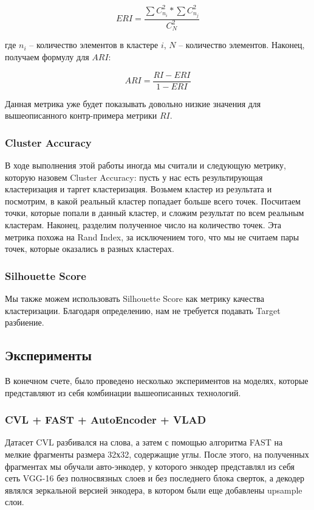 $$
ERI = \frac{\sum C_{n_i}^2 * \sum C_{n_j}^2}{C_N^2}
$$

\noindent где $n_i$ -- количество элементов в кластере $i$, $N$ -- количество элементов. Наконец, получаем формулу для $ARI$:

$$
ARI = \frac{RI - ERI}{1 - ERI}
$$

Данная метрика уже будет показывать довольно низкие значения для вышеописанного контр-примера метрики $RI$. 

\subsubsection{Cluster Accuracy}

В ходе выполнения этой работы иногда мы считали и следующую метрику, которую назовем Cluster Accuracy: пусть у нас есть результирующая кластеризация и таргет кластеризация. Возьмем кластер из результата и посмотрим, в какой реальный кластер попадает больше всего точек. Посчитаем точки, которые попали в данный кластер, и сложим результат по всем реальным кластерам. Наконец, разделим полученное число на количество точек. Эта метрика похожа на Rand Index, за исключением того, что мы не считаем пары точек, которые оказались в разных кластерах.

\subsubsection{Silhouette Score}

Мы также можем использовать Silhouette Score как метрику качества кластеризации. Благодаря определению, нам не требуется подавать Target разбиение.

\subsection{Эксперименты}

В конечном счете, было проведено несколько экспериментов на моделях, которые представляют из себя комбинации вышеописанных технологий. 

\subsubsection{CVL + FAST + AutoEncoder + VLAD}

Датасет CVL разбивался на слова, а затем с помощью алгоритма FAST на мелкие фрагменты размера 32х32, содержащие углы. После этого, на полученных фрагментах мы обучали авто-энкодер, у которого энкодер представлял из себя сеть VGG-16 без полносвязных слоев и без последнего блока сверток, а декодер являлся зеркальной версией энкодера, в котором были еще добавлены upsample слои.

